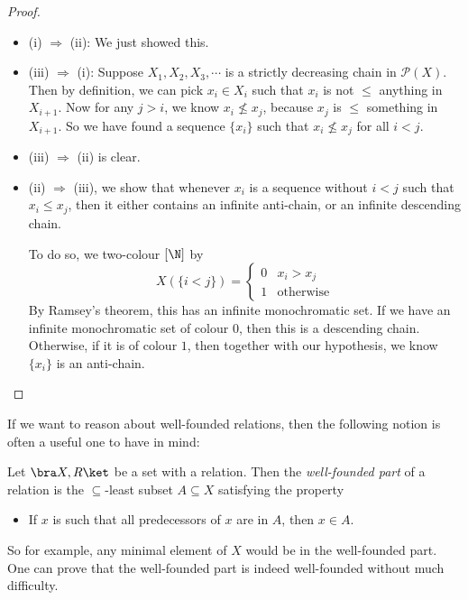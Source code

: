 \documentclass[a4paper]{article}
\begin{document}
\begin{proof}\leavevmode
  \begin{itemize}
    \item (i) $\Rightarrow$ (ii): We just showed this.
    \item (iii) $\Rightarrow$ (i): Suppose $X_1, X_2, X_3, \cdots$ is a strictly decreasing chain in $\mathcal{P}(X)$. Then by definition, we can pick $x_i \in X_i$ such that $x_i$ is not $\leq$ anything in $X_{i + 1}$. Now for any $j > i$, we know $x_i \not \leq x_j$, because $x_j$ is $\leq$ something in $X_{i + 1}$. So we have found a sequence $\{x_i\}$ such that $x_i \not \leq x_j$ for all $i < j$.

    \item (iii) $\Rightarrow$ (ii) is clear.

    \item (ii) $\Rightarrow$ (iii), we show that whenever $x_i$ is a sequence without $i < j$ such that $x_i \leq x_j$, then it either contains an infinite anti-chain, or an infinite descending chain.

      To do so, we two-colour $[\N]$ by
      \[
        X(\{i < j\}) =
        \begin{cases}
          0 & x_i > x_j\\
          1 & \text{otherwise}
        \end{cases}
      \]
      By Ramsey's theorem, this has an infinite monochromatic set. If we have an infinite monochromatic set of colour $0$, then this is a descending chain. Otherwise, if it is of colour $1$, then together with our hypothesis, we know $\{x_i\}$ is an anti-chain.
  \end{itemize}
\end{proof}

If we want to reason about well-founded relations, then the following notion is often a useful one to have in mind:
\begin{defi}
  Let $\bra X, R\ket$ be a set with a relation. Then the \emph{well-founded part} of a relation is the $\subseteq$-least subset $A \subseteq X$ satisfying the property
  \begin{itemize}
    \item If $x$ is such that all predecessors of $x$ are in $A$, then $x \in A$.
  \end{itemize}
\end{defi}
So for example, any minimal element of $X$ would be in the well-founded part. One can prove that the well-founded part is indeed well-founded without much difficulty.
\end{document}
